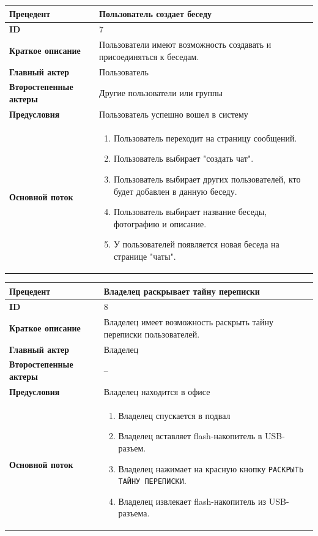 \begin{center}
  \begin{tabular}{|l|p{9cm}|}
  \hline
  \textbf{Прецедент} & Пользователь создает беседу \\
  \hline
  \textbf{ID} & 7 \\
  \hline
  \textbf{Краткое описание} & Пользователи имеют возможность создавать и присоединяться к беседам.\\
  \hline
  \textbf{Главный актер} & Пользователь\\
  \hline
  \textbf{Второстепенные актеры} & Другие пользователи или группы \\
  \hline
  \textbf{Предусловия} & Пользователь успешно вошел в систему \\
  \hline
  \textbf{Основной поток} & \begin{enumerate}
    \item Пользователь переходит на страницу сообщений.
    \item Пользователь выбирает "создать чат".
    \item Пользователь выбирает других пользователей, кто будет добавлен в данную беседу.
    \item Пользователь выбирает название беседы, фотографию  и описание.
    \item У пользователей появляется новая беседа на странице "чаты".
  \end{enumerate} \\
  \hline
\end{tabular}
\end{center}

\begin{center}
  \begin{tabular}{|l|p{9cm}|}
  \hline
  \textbf{Прецедент} & Владелец раскрывает тайну переписки \\
  \hline
  \textbf{ID} & 8 \\
  \hline
  \textbf{Краткое описание} & Владелец имеет возможность раскрыть тайну переписки пользователей.\\
  \hline
  \textbf{Главный актер} & Владелец\\
  \hline
  \textbf{Второстепенные актеры} & -- \\
  \hline
  \textbf{Предусловия} & Владелец находится в офисе \\
  \hline
  \textbf{Основной поток} & \begin{enumerate}
    \item Владелец спускается в подвал
    \item Владелец вставляет flash-накопитель в USB-разъем.
    \item Владелец нажимает на красную кнопку \texttt{РАСКРЫТЬ ТАЙНУ ПЕРЕПИСКИ}.
    \item Владелец извлекает flash-накопитель из USB-разъема.
  \end{enumerate} \\
  \hline
\end{tabular}
\end{center}

